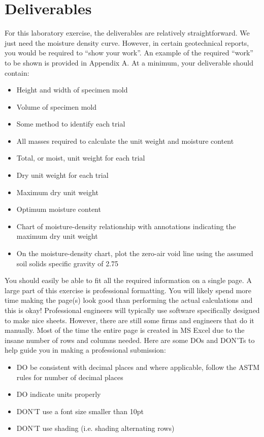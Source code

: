 \documentclass[12pt]{article}
\begin{document}
\pagebreak
\section{Deliverables}
For this laboratory exercise, the deliverables are relatively straightforward. We just need the moisture density curve. However, in certain geotechnical reports, you would be required to ``show your work''. An example of the required ``work'' to be shown is provided in Appendix A. At a minimum, your deliverable should contain:
\begin{itemize}
    \item Height and width of specimen mold
    \item Volume of specimen mold
    \item Some method to identify each trial
    \item All masses required to calculate the unit weight and moisture content
    \item Total, or moist, unit weight for each trial
    \item Dry unit weight for each trial
    \item Maximum dry unit weight
    \item Optimum moisture content
    \item Chart of moisture-density relationship with annotations indicating the maximum dry unit weight
    \item On the moisture-density chart, plot the zero-air void line using the assumed soil solids specific gravity of 2.75
\end{itemize}

You should easily be able to fit all the required information on a single page. A large part of this exercise is professional formatting. You will likely spend more time making the page(s) look good than performing the actual calculations and this is okay! Professional engineers will typically use software specifically designed to make nice sheets. However, there are still some firms and engineers that do it manually. Most of the time the entire page is created in MS Excel due to the insane number of rows and columns needed. Here are some DOs and DON'Ts to help guide you in making a professional submission:

\begin{itemize}
    \item DO be consistent with decimal places and where applicable, follow the ASTM rules for number of decimal places
    \item DO indicate units properly
    \item DON'T use a font size smaller than 10pt
    \item DON'T use shading (i.e. shading alternating rows)
\end{itemize}
\end{document}
